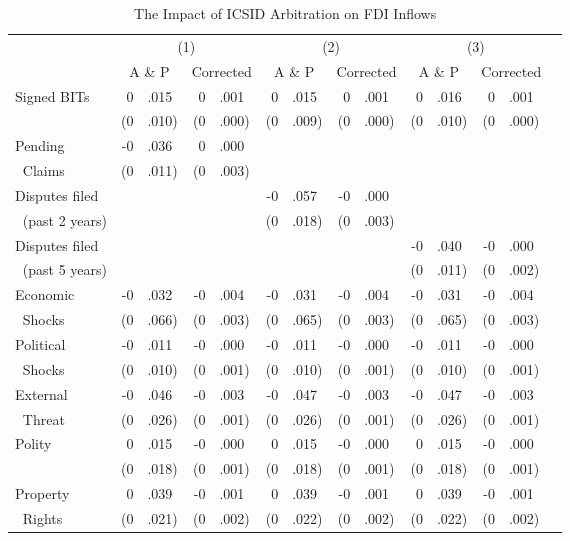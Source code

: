 \documentclass[12pt,onesided]{amsart}
\begin{document}
\begin{table}[ht]
\vspace{1cm}
\centering
{\footnotesize
\caption{The Impact of ICSID Arbitration on FDI Inflows}
\label{tab:allee}
\begin{tabular}{lr@{} lr@{}lr@{}lr@{}lr@{}lr@{}lr@{} }
	\hline\hline
	~ & \multicolumn{4}{c}{(1)} & \multicolumn{4}{c}{(2)} & \multicolumn{4}{c}{(3)} \\	
	~ & \multicolumn{2}{c}{A \& P} & \multicolumn{2}{c}{Corrected} & \multicolumn{2}{c}{A \& P} & \multicolumn{2}{c}{Corrected} & \multicolumn{2}{c}{A \& P} & \multicolumn{2}{c}{Corrected}
	 \\ \hline
	\multirow{2}{*}{Signed BITs} & 0&.015 & 0&.001 & 0&.015 & 0&.001 & 0&.016 & 0&.001 \\
	~ & (0&.010) & (0&.000) & (0&.009) & (0&.000) & (0&.010) & (0&.000) \\
	Pending &-0&.036 &0&.000 && && && \\
	$\;\;$Claims &(0&.011) &(0&.003) && && && \\
	Disputes filed && && &-0&.057 &-0&.000 && && \\
	$\;\;$(past 2 years) && && &(0&.018) &(0&.003) && && \\
	Disputes filed && && && && &-0&.040 &-0&.000 \\
	$\;\;$(past 5 years) && && && && &(0&.011) &(0&.002) \\
	Economic & -0&.032 & -0&.004 & -0&.031 & -0&.004 & -0&.031 & -0&.004 \\
	$\;\;$Shocks & (0&.066) & (0&.003) & (0&.065) & (0&.003) & (0&.065) & (0&.003) \\
	Political & -0&.011 & -0&.000 & -0&.011 & -0&.000 & -0&.011 & -0&.000 \\
	$\;\;$Shocks & (0&.010) & (0&.001) & (0&.010) & (0&.001) & (0&.010) &(0&.001) \\
	External & -0&.046 & -0&.003 & -0&.047 & -0&.003 & -0&.047 & -0&.003 \\
	$\;\;$Threat & (0&.026) & (0&.001) & (0&.026) & (0&.001) & (0&.026) & (0&.001) \\
	\multirow{2}{*}{Polity} & 0&.015 & -0&.000 & 0&.015 & -0&.000 & 0&.015 & -0&.000 \\
	~ & (0&.018) & (0&.001) & (0&.018) & (0&.001) & (0&.018) &(0&.001) \\
	Property & 0&.039 & -0&.001 &  0&.039 & -0&.001 &  0&.039 & -0&.001 \\
	$\;\;$Rights & (0&.021) & (0&.002) & (0&.022) & (0&.002) & (0&.022) & (0&.002) \\

\end{tabular}}
\end{table}
\end{document}

